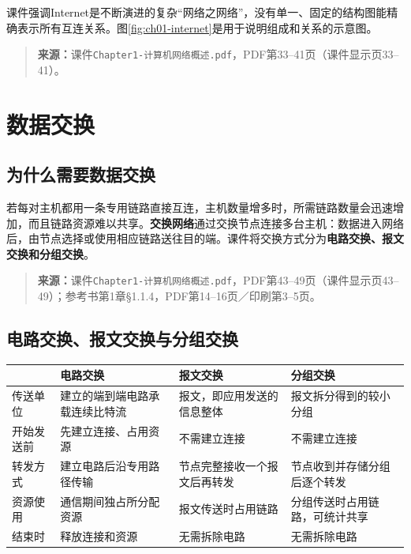 课件强调Internet是不断演进的复杂“网络之网络”，没有单一、固定的结构图能精确表示所有互连关系。图\ref{fig:ch01-internet}是用于说明组成和关系的示意图。

\begin{quote}\small\textbf{来源：}课件\texttt{Chapter1-计算机网络概述.pdf}，PDF第33--41页（课件显示页33--41）。\end{quote}
\annotationarea[4]

\section{数据交换}

\subsection{为什么需要数据交换}

若每对主机都用一条专用链路直接互连，主机数量增多时，所需链路数量会迅速增加，而且链路资源难以共享。\textbf{交换网络}通过交换节点连接多台主机：数据进入网络后，由节点选择或使用相应链路送往目的端。课件将交换方式分为\textbf{电路交换、报文交换和分组交换}。

\begin{quote}\small\textbf{来源：}课件\texttt{Chapter1-计算机网络概述.pdf}，PDF第43--49页（课件显示页43--49）；参考书第1章§1.1.4，PDF第14--16页／印刷第3--5页。\end{quote}
\annotationarea[4]

\subsection{电路交换、报文交换与分组交换}

\begin{center}
\begin{tabularx}{0.98\textwidth}{l X X X}
\toprule
 & 电路交换 & 报文交换 & 分组交换\\
\midrule
传送单位 & 建立的端到端电路承载连续比特流 & 报文，即应用发送的信息整体 & 报文拆分得到的较小分组\\
开始发送前 & 先建立连接、占用资源 & 不需建立连接 & 不需建立连接\\
转发方式 & 建立电路后沿专用路径传输 & 节点完整接收一个报文后再转发 & 节点收到并存储分组后逐个转发\\
资源使用 & 通信期间独占所分配资源 & 报文传送时占用链路 & 分组传送时占用链路，可统计共享\\
结束时 & 释放连接和资源 & 无需拆除电路 & 无需拆除电路\\
\bottomrule
\end{tabularx}
\end{center}

